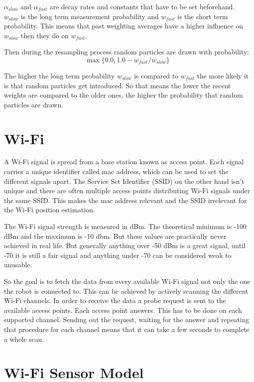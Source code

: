 $\alpha_{slow}$ and $\alpha_{fast}$ are decay rates and constants that have to be set beforehand. $w_{slow}$ is the long term measurement probability and $w_{fast}$ is the short term probability. This means that past weighting averages have a higher influence on $w_{slow}$ then they do on $w_{fast}$. 

Then during the resampling process random particles are drawn with probability:
\begin{equation}\label{eq:quality}
\max\{0.0, 1.0-w_{fast}/w_{slow}\}
\end{equation}

The higher the long term probability $w_{slow}$ is compared to $w_{fast}$ the more likely it is that random particles get introduced. So that means the lower the recent weights are compared to the older ones, the higher the probability that random particles are drawn. \cite[p. 258-259]{Thrun:2005:PR:1121596}
\section{Wi-Fi}
A Wi-Fi signal is spread from a base station known as access point. Each signal carries a unique identifier called mac address, which can be used to set the different signals apart. The Service Set Identifier (SSID) on the other hand isn't unique and there are often multiple access points distributing Wi-Fi signals under the same SSID. This makes the mac address relevant and the SSID irrelevant for the Wi-Fi position estimation.

The Wi-Fi signal strength is measured in dBm. The theoretical minimum is -100 dBm and the maximum is -10 dbm. But these values are practically never achieved in real life. But generally anything over -50 dBm is a great signal, until -70 it is still a fair signal and anything under -70 can be considered weak to unusable. 

So the goal is to fetch the data from every available Wi-Fi signal not only the one the robot is connected to. This can be achieved by actively scanning the different Wi-Fi channels. In order to receive the data a probe request is sent to the available access points. Each access point answers. This has to be done on each supported channel. Sending out the request, waiting for the answer and repeating that procedure for each channel means that it can take a few seconds to complete a whole scan.

\section{Wi-Fi Sensor Model} \label{sec:gp}
